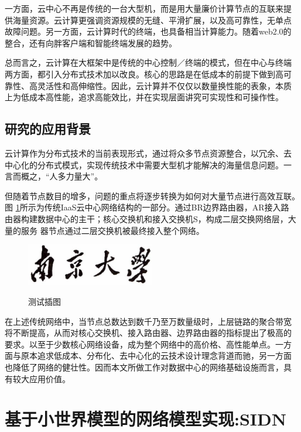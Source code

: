 \documentclass[oneside, phd]{njuthesis}
\begin{document}
一方面，云中心不再是传统的一台大型机，而是用大量廉价计算节点的互联来提
供海量资源。云计算更强调资源规模的无缝、平滑扩展，以及高可靠性，无单点
故障问题。另一方面，云计算时代的终端，也具备相当计算能力。随着web2.0的
整合，还有向胖客户端和智能终端发展的趋势。

总而言之，云计算在大框架中是传统的中心控制／终端的模式，但在中心与终端
两方面，都引入分布式技术加以改良。核心的思路是在低成本的前提下做到高可
靠性、高灵活性和高伸缩性。因此，云计算并不仅仅以数量换性能的表象，本质
上为低成本高性能，追求高能效比，并在实现层面讲究可实现性和可操作性。

\section{研究的应用背景}

云计算作为分布式技术的当前表现形式，通过将众多节点资源整合，以冗余、去
中心化的分布式模式，实现传统技术中需要大型机才能解决的海量信息问题。一
言而概之，“人多力量大”。

但随着节点数目的增多，问题的重点将逐步转换为如何对大量节点进行高效互联。图
\ref{fig:test1}所示为传统IaaS云中心网络结构的一部分。通过BR边界路由器，AR接入路
由器构建数据中心的主干；核心交换机和接入交换机S，构成二层交换网络层，大量的服务
器节点通过二层交换机被最终接入整个网络。

\begin{figure}[htbp]
  \centering
  \includegraphics[width= 0.5\textwidth]{njuname.eps}\\
  \caption{测试插图}\label{fig:test1}
\end{figure}

在上述传统网络中，当节点总数达到数千乃至万数量级时，上层链路的聚合带宽
将不断提高，从而对核心交换机、接入路由器、边界路由器的指标提出了极高的
要求。以至于少数核心网络设备，成为整个网络中的高价格、高性能单点。一方
面与原本追求低成本、分布化、去中心化的云技术设计理念背道而驰，另一方面
也降低了网络的健壮性。因而本文所做工作对数据中心的网络基础设施而言，具
有较大应用价值。

\chapter{基于小世界模型的网络模型实现:SIDN}\label{chapter_smallworld}
\end{document}
